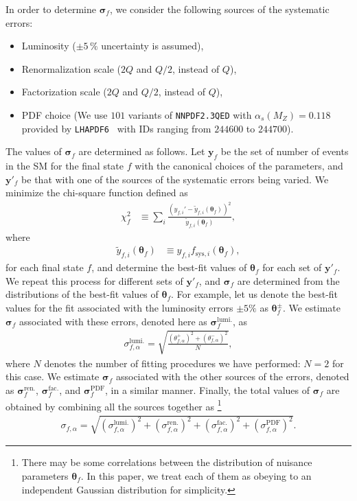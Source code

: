 \documentclass[12pt,twoside,book]{article}
\begin{document}
In order to determine $\bm{\sigma}_f$, we consider the following sources of the systematic errors:
\begin{itemize}
  \item Luminosity ($\pm 5\,\%$ uncertainty is assumed),
  \item Renormalization scale ($2Q$ and $Q/2$, instead of $Q$),
  \item Factorization scale ($2Q$ and $Q/2$, instead of $Q$),
  \item PDF choice (We use $101$ variants of \texttt{NNPDF2.3QED} with $\alpha_s (M_Z) = 0.118$~\cite{Ball:2013hta} provided by \texttt{LHAPDF6}~\cite{Buckley:2014ana} with IDs ranging from $244600$ to $244700$).
\end{itemize}
The values of $\bm{\sigma}_f$ are determined as follows.
Let $\bm{y}_f$ be the set of number of events in the SM for the final state $f$ with the canonical choices of the parameters, and $\bm{y}'_f$ be that with one of the sources of the systematic errors being varied.
We minimize the chi-square function defined as
\begin{align}
  \chi^2_f &\equiv \sum_i \frac
  {\left( y_{f,i}' - \tilde{y}_{f,i} (\bm{\theta}_f) \right)^2}
  {\tilde{y}_{f,i} (\bm{\theta}_f)},
\end{align}
where
\begin{align}
  \tilde{y}_{f,i} (\bm{\theta}_f) &\equiv
  y_{f,i} f_{\mathrm{sys},i} (\bm{\theta}_f),
\end{align}
for each final state $f$, and determine the best-fit values of $\bm{\theta}_f$ for each set of $\bm{y}'_f$.
We repeat this process for different sets of $\bm{y}'_f$, and $\bm{\sigma}_f$ are determined from the distributions of the best-fit values of $\bm{\theta}_f$.
For example, let us denote the best-fit values for the fit associated with the luminosity errors $\pm 5\%$ as $\bm{\theta}_f^{\pm}$.
We estimate $\bm{\sigma}_f$ associated with these errors, denoted here as $\bm{\sigma}_f^{\mathrm{lumi.}}$, as
\begin{align}
  \sigma_{f,\alpha}^{\mathrm{lumi.}} = \sqrt{\frac{(\theta_{f,\alpha}^{+})^2 + (\theta_{f,\alpha}^{-})^2}{N}},
\end{align}
where $N$ denotes the number of fitting procedures we have performed: $N=2$ for this case.
We estimate $\bm{\sigma}_f$ associated with the other sources of the errors, denoted as $\bm{\sigma}_f^{\mathrm{ren.}}$, $\bm{\sigma}_f^{\mathrm{fac.}}$, and $\bm{\sigma}_f^{\mathrm{PDF}}$, in a similar manner.
Finally, the total values of $\bm{\sigma}_f$ are obtained by combining all the sources together as
\footnote{
  There may be some correlations between the distribution of nuisance parameters $\bm{\theta}_{f}$.
  In this paper, we treat each of them as obeying to an independent Gaussian distribution for simplicity.
}
\begin{align}
  \sigma_{f,\alpha} = \sqrt{(\sigma_{f,\alpha}^{\mathrm{lumi.}})^2
  + (\sigma_{f,\alpha}^{\mathrm{ren.}})^2
  + (\sigma_{f,\alpha}^{\mathrm{fac.}})^2
  + (\sigma_{f,\alpha}^{\mathrm{PDF}})^2}.
  \label{eq_comb_sig}
\end{align}
\end{document}
